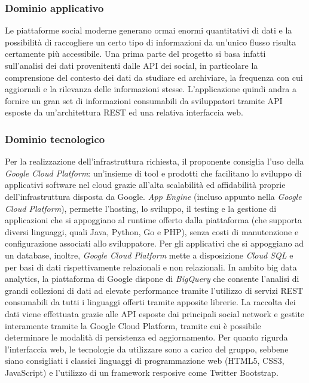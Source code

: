 \subsubsection{Dominio applicativo}
Le piattaforme social moderne generano ormai enormi quantitativi di dati e la possibilità di raccogliere un certo tipo di informazioni da un'unico flusso risulta certamente più accessibile. Una prima parte del progetto si basa infatti sull'analisi dei dati provenitenti dalle API dei social, in particolare la comprensione del contesto dei dati da studiare ed archiviare, la frequenza con cui aggiornali e la rilevanza delle informazioni stesse.
L'applicazione quindi andra a fornire un gran set di informazioni consumabili da sviluppatori tramite API esposte da un'architettura REST ed una relativa interfaccia web. 

\subsubsection{Dominio tecnologico}
Per la realizzazione dell'infrastruttura richiesta, il proponente consiglia l'uso della \emph{Google Cloud Platform}: un'insieme di tool e prodotti che facilitano lo sviluppo di applicativi software nel cloud grazie all'alta scalabilità ed affidabilità proprie dell'infrastruttura disposta da Google. \emph{App Engine} (incluso appunto nella \emph{Google Cloud Platform}), permette l'hosting, lo sviluppo, il testing e la gestione di applicazioni che si appoggiano al runtime offerto dalla piattaforma (che supporta diversi linguaggi, quali Java, Python, Go e PHP), senza costi di manutenzione e configurazione associati allo sviluppatore. Per gli applicativi che si appoggiano ad un database, inoltre, \emph{Google Cloud Platform} mette a disposizione \emph{Cloud SQL} e  per basi di dati rispettivamente relazionali e non relazionali. In ambito big data analytics, la piattaforma di Google dispone di \emph{BigQuery} che consente l'analisi di grandi collezioni di dati ad elevate performance tramite l'utilizzo di servizi REST consumabili da tutti i linguaggi offerti tramite apposite librerie.
La raccolta dei dati viene effettuata grazie alle API esposte dai principali social network e gestite interamente tramite la Google Cloud Platform, tramite cui è possibile determinare le modalità di persistenza ed aggiornamento. 
Per quanto rigurda l'interfaccia web, le tecnologie da utilizzare sono a carico del gruppo, sebbene siano consigliati i classici linguaggi di programmazione web (HTML5, CSS3, JavaScript) e l'utilizzo di un framework resposive come Twitter Bootstrap.
